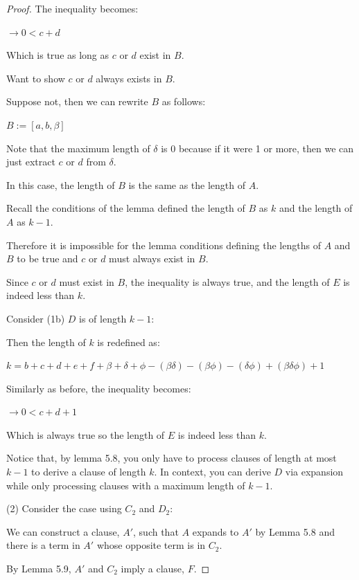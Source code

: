 \documentclass[manuscript]{acmart}
\begin{document}
\begin{proof}
        The inequality becomes:

        $\rightarrow 0 < c + d$

        Which is true as long as $c$ or $d$ exist in $B$.

        Want to show $c$ or $d$ always exists in $B$.

        Suppose not, then we can rewrite $B$ as follows:

        $B := [a, b, \beta]$

        Note that the maximum length of $\delta$ is 0 because if it were 1
        or more, then we can just extract $c$ or $d$ from $\delta$.

        In this case, the length of $B$ is the same as the length of $A$.
        
        Recall the conditions of the lemma defined the length of $B$ as $k$
        and the length of $A$ as $k-1$.

        Therefore it is impossible for the lemma conditions defining the lengths
        of $A$ and $B$ to be true and $c$ or $d$ must always exist in $B$.

        Since $c$ or $d$ must exist in $B$, the inequality is always true, 
        and the length of $E$ is indeed less than $k$.

        Consider (1b) $D$ is of length $k - 1$:

        Then the length of $k$ is redefined as:

        $k = b + c + d + e + f + \beta + \delta + \phi - (\beta \delta) 
        - (\beta \phi) - (\delta \phi) + (\beta \delta \phi) + 1$

        Similarly as before, the inequality becomes:

        $\rightarrow 0 < c + d + 1$

        Which is always true so the length of $E$ is indeed less than $k$.

        Notice that, by lemma 5.8, you only have to process clauses of length
        at most $k-1$ to derive a clause of length $k$. In context, you 
        can derive $D$ via expansion while only processing clauses with
        a maximum length of $k-1$.

        (2) Consider the case using $C_2$ and $D_2$:

        We can construct a clause, $A'$, such that $A$ expands to $A'$ by 
        Lemma 5.8 and there is a term in $A'$ whose opposite term is in $C_2$.

        By Lemma 5.9, $A'$ and $C_2$ imply a clause, $F$.


\end{proof}
\end{document}
